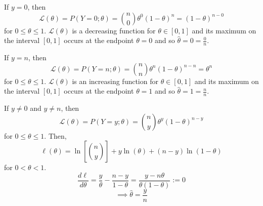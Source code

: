 \begin{Proof}{}{}
    If $ y=0 $, then
    \[ \mathcal{L}(\theta)=P(Y=0;\theta)=\binom{n}{0}\theta^0(1-\theta)^n=(1-\theta)^{n-0} \]
    for $ 0\leqslant \theta \leqslant 1 $. $ \mathcal{L}(\theta) $ is a decreasing function
    for $ \theta\in[0,1] $ and its maximum on the interval $ [0,1] $
    occurs at the endpoint $ \theta=0 $ and so $ \hat{\theta}=0=\frac{0}{n} $.

    If $ y=n $, then
    \[ \mathcal{L}(\theta)=P(Y=n;\theta)=\binom{n}{n}\theta^n(1-\theta)^{n-n}=\theta^n \]
    for $ 0\leqslant \theta \leqslant 1 $. $ \mathcal{L}(\theta) $ is an increasing function
    for $ \theta\in[0,1] $ and its maximum on the interval $ [0,1] $
    occurs at the endpoint $ \theta=1 $ and so $ \hat{\theta}=1=\frac{n}{n} $.

    If $ y\neq 0 $ and $ y\neq n $, then
    \[ \mathcal{L}(\theta)=P(Y=y;\theta)=\binom{n}{y}\theta^y(1-\theta)^{n-y} \]
    for $ 0\leqslant \theta\leqslant 1 $. Then,
    \[ \ell(\theta)=\ln\left[ \binom{n}{y} \right]+y\ln(\theta)+(n-y)\ln(1-\theta) \]
    for $ 0<\theta<1 $.
    \[ \frac{d\ell}{d\theta}=\frac{y}{\theta}-\frac{n-y}{1-\theta}=\frac{y-n\theta}{\theta(1-\theta)}:=0  \]
    \[ \implies \hat{\theta}=\frac{y}{n} \]
\end{Proof}

